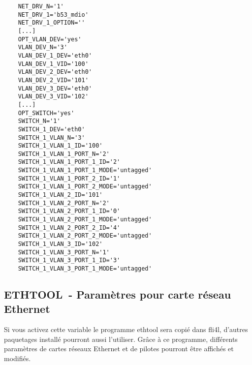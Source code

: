 \begin{example}
\begin{verbatim}
    NET_DRV_N='1'
    NET_DRV_1='b53_mdio'
    NET_DRV_1_OPTION=''
    [...]
    OPT_VLAN_DEV='yes'
    VLAN_DEV_N='3'
    VLAN_DEV_1_DEV='eth0'
    VLAN_DEV_1_VID='100'
    VLAN_DEV_2_DEV='eth0'
    VLAN_DEV_2_VID='101'
    VLAN_DEV_3_DEV='eth0'
    VLAN_DEV_3_VID='102'
    [...]
    OPT_SWITCH='yes'
    SWITCH_N='1'
    SWITCH_1_DEV='eth0'
    SWITCH_1_VLAN_N='3'
    SWITCH_1_VLAN_1_ID='100'
    SWITCH_1_VLAN_1_PORT_N='2'
    SWITCH_1_VLAN_1_PORT_1_ID='2'
    SWITCH_1_VLAN_1_PORT_1_MODE='untagged'
    SWITCH_1_VLAN_1_PORT_2_ID='1'
    SWITCH_1_VLAN_1_PORT_2_MODE='untagged'
    SWITCH_1_VLAN_2_ID='101'
    SWITCH_1_VLAN_2_PORT_N='2'
    SWITCH_1_VLAN_2_PORT_1_ID='0'
    SWITCH_1_VLAN_2_PORT_1_MODE='untagged'
    SWITCH_1_VLAN_2_PORT_2_ID='4'
    SWITCH_1_VLAN_2_PORT_2_MODE='untagged'
    SWITCH_1_VLAN_3_ID='102'
    SWITCH_1_VLAN_3_PORT_N='1'
    SWITCH_1_VLAN_3_PORT_1_ID='3'
    SWITCH_1_VLAN_3_PORT_1_MODE='untagged'
\end{verbatim}
\end{example}

\subsection{ETHTOOL~- Paramètres pour carte réseau Ethernet}

Si vous activez cette variable  le programme ethtool
sera copié dans fli4l, d'autres paquetages installé pourront aussi l'utiliser.
Grâce à ce programme, différents paramètres de cartes réseaux Ethernet et de
pilotes pourront être affichés et modifiés.

